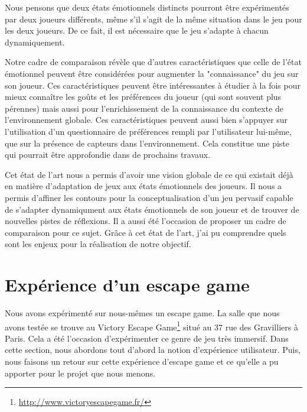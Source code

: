 \documentclass[11pt]{article}
\begin{document}
			Nous pensons que deux états émotionnels distincts pourront être expérimentés par deux joueurs différents, même s'il s'agit de la même situation dans le jeu pour les deux joueurs.
			De ce fait, il est nécessaire que le jeu s'adapte à chacun dynamiquement.\par
			Notre cadre de comparaison révèle que d'autres caractéristiques que celle de l'état émotionnel peuvent être considérées pour augmenter la "connaissance" du jeu sur son joueur.
			Ces caractéristiques peuvent être intéressantes à étudier à la fois pour mieux connaître les goûts et les préférences du joueur (qui sont souvent plus pérennes) mais aussi pour l'enrichissement de la connaissance du contexte de l'environnement globale.
			Ces caractéristiques peuvent aussi bien s'appuyer sur l'utilisation d'un questionnaire de préférences rempli par l'utilisateur lui-même, que sur la présence de capteurs dans l'environnement.
			Cela constitue une piste qui pourrait être approfondie dans de prochains travaux.\par
			Cet état de l'art nous a permis d'avoir une vision globale de ce qui existait déjà en matière d'adaptation de jeux aux états émotionnels des joueurs. 
			Il nous a permis d'affiner les contours pour la conceptualisation d'un jeu pervasif capable de s'adapter dynamiqument aux états émotionnels de son joueur et de trouver de nouvelles pistes de réflexions. 
			Il a aussi été l'occasion de proposer un cadre de comparaison pour ce sujet.
			Grâce à cet état de l'art, j'ai pu comprendre quels sont les enjeux pour la réalisation de notre objectif.

\section{Expérience d'un escape game}\label{sec:escape}
	Nous avons expérimenté sur nous-mêmes un escape game.
	La salle que nous avons testée se trouve au Victory Escape Game\footnote{\href{http://www.victoryescapegame.fr/}{http://www.victoryescapegame.fr/}} situé au 37 rue des Gravilliers à Paris.
	Cela a été l'occasion d'expérimenter ce genre de jeu très immersif. 
	Dans cette section, nous abordons tout d'abord la notion d'expérience utilisateur.
	Puis, nous faisons un retour sur cette expérience d'escape game et ce qu'elle a pu apporter pour le projet que nous menons.
\end{document}
